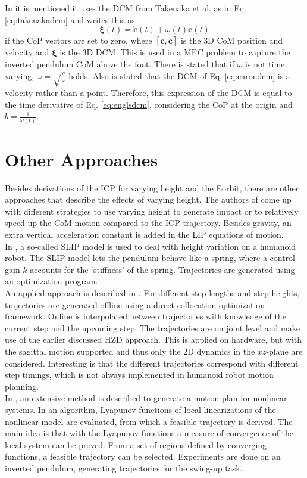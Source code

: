 In \cite{caron2018capturability} it is mentioned it uses the \ac{DCM} from Takenaka et al. as in Eq. \eqref{eq:takenakadcm} and writes this as 
\begin{equation}
\boldsymbol{\xi}(t) = \boldsymbol{\dot{c}}(t) + \omega(t)\boldsymbol{c}(t)
\label{eq:carondcm}
\end{equation}
if the \ac{CoP} vectors are set to zero, where $[\boldsymbol{c},\boldsymbol{\dot{c}}]$ is the \ac{3D} \ac{CoM} position and velocity and $\boldsymbol{\xi}$ is the \ac{3D} \ac{DCM}. This is used in a \ac{MPC} problem to capture the inverted pendulum \ac{CoM} above the foot. There is stated that if $\omega$ is not time varying, $\omega=\sqrt{\frac{g}{z}}$ holds. Also is stated that the \ac{DCM} of Eq. \eqref{eq:carondcm} is a velocity rather than a point. Therefore, this expression of the \ac{DCM} is equal to the time derivative of Eq. \eqref{eq:englsdcm}, considering the \ac{CoP} at the origin and $b=\frac{1}{\omega(t)}$.

\section{Other Approaches}
Besides derivations of the \ac{ICP} for varying height and the \ac{Eorbit}, there are other approaches that describe the effects of varying height. The authors of \cite{gao2017increase} come up with different strategies to use varying height to generate impact or to relatively speed up the \ac{CoM} motion compared to the \ac{ICP} trajectory. Besides gravity, an extra vertical acceleration constant is added in the \ac{LIP} equations of motion. \\
In \cite{liu2015trajectory}, a so-called \ac{SLIP} model is used to deal with height variation on a humanoid robot. The \ac{SLIP} model lets the pendulum behave like a spring, where a control gain $k$ accounts for the `stiffness' of the spring. Trajectories are generated using an optimization program.\\
An applied approach is described in \cite{nguyen2017dynamic}. For different step lengths and step heights, trajectories are generated offline using a direct collocation optimization framework. Online is interpolated between trajectories with knowledge of the current step and the upcoming step. The trajectories are on joint level and make use of the earlier discussed \ac{HZD} approach. This is applied on hardware, but with the sagittal motion supported and thus only the \ac{2D} dynamics in the $xz$-plane are considered. Interesting is that the different trajectories correspond with different step timings, which is not always implemented in humanoid robot motion planning.\\
In \cite{tedrake2010lqr}, an extensive method is described to generate a motion plan for nonlinear systems. In an algorithm, Lyapunov functions of local linearizations of the nonlinear model are evaluated, from which a feasible trajectory is derived. The main idea is that with the Lyapunov functions a measure of convergence of the local system can be proved. From a set of regions defined by converging functions, a feasible trajectory can be selected. Experiments are done on an inverted pendulum, generating trajectories for the swing-up task.\\


